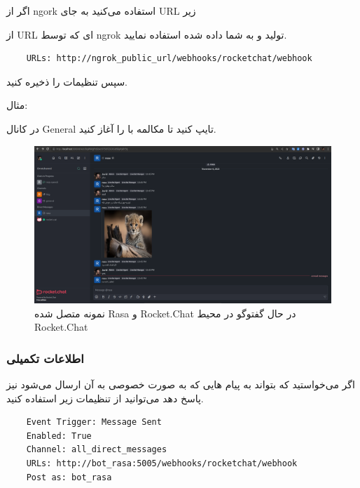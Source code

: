 اگر از ngork استفاده می‌کنید به جای URL زیر 


از URL ای که توسط ngrok تولید و به شما داده شده استفاده نمایید.

\begin{latin}
    \begin{verbatim}
    URLs: http://ngrok_public_url/webhooks/rocketchat/webhook
    \end{verbatim}
\end{latin}

سپس تنظیمات را ذخیره کنید.

مثال:

در کانال General تایپ کنید  تا مکالمه با  را آغاز کنید.

\begin{figure}[h]
    \includegraphics[width=\linewidth]{Images/Working_Connected_Rocket.Chat_Rasa_Example.png}
    \caption{نمونه متصل شده Rasa و Rocket.Chat در حال گفتوگو در محیط Rocket.Chat}
\end{figure}

\subsubsection{اطلاعات تکمیلی}

اگر می‌خواستید که  بتواند به پیام هایی که به صورت خصوصی به آن ارسال می‌شود نیز پاسخ دهد می‌توانید از تنظیمات زیر استفاده کنید.

\begin{latin}
    \begin{verbatim}
    Event Trigger: Message Sent
    Enabled: True
    Channel: all_direct_messages
    URLs: http://bot_rasa:5005/webhooks/rocketchat/webhook
    Post as: bot_rasa
    \end{verbatim}
\end{latin}


\newpage